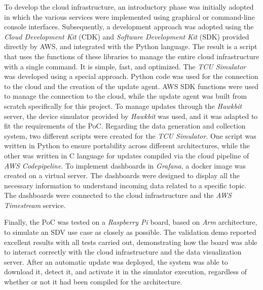 \documentclass[10pt,a4paper,roman, twocolumn]{article}
\begin{document}
To develop the cloud infrastructure, an introductory phase was initially adopted in which the various services were implemented using graphical or command-line console interfaces. Subsequently, a development approach was adopted using the \textit{Cloud Development Kit} (CDK) and \textit{Software Development Kit} (SDK) provided directly by AWS, and integrated with the Python language. The result is a script that uses the functions of these libraries to manage the entire cloud infrastructure with a single command. It is simple, fast, and optimized.
The \textit{TCU Simulator} was developed using a special approach. Python code was used for the connection to the cloud and the creation of the update agent. AWS SDK functions were used to manage the connection to the cloud, while the update agent was built from scratch specifically for this project. To manage updates through the \textit{Hawkbit} server, the device simulator provided by \textit{Hawkbit} was used, and it was adapted to fit the requirements of the PoC. Regarding the data generation and collection system, two different scripts were created for the \textit{TCU Simulator}. One script was written in Python to ensure portability across different architectures, while the other was written in C language for updates compiled via the cloud pipeline of \textit{AWS Codepipeline}.
To implement dashboards in \textit{Grafana}, a docker image was created on a virtual server. The dashboards were designed to display all the necessary information to understand incoming data related to a specific topic. The dashboards were connected to the cloud infrastructure and the \textit{AWS Timestream} service.

Finally, the PoC was tested on a \textit{Raspberry Pi} board, based on \textit{Arm} architecture, to simulate an SDV use case as closely as possible. The validation demo reported excellent results with all tests carried out, demonstrating how the board was able to interact correctly with the cloud infrastructure and the data visualization server. After an automatic update was deployed, the system was able to download it, detect it, and activate it in the simulator execution, regardless of whether or not it had been compiled for the architecture.
\end{document}
